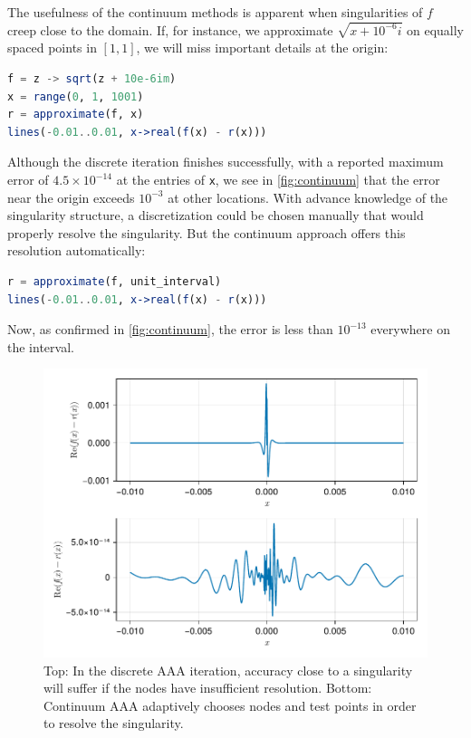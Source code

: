 \documentclass{juliacon}
\begin{document}
The usefulness of the continuum methods is apparent when singularities of $f$ creep close to the domain. If, for instance, we approximate $\sqrt{x + 10^{-6}i}$ on equally spaced points in $[1,1]$, we will miss important details at the origin:
\begin{lstlisting}[language = Julia, caption={Discrete AAA for $\sqrt{x + 10^{-6}i}$.}]
f = z -> sqrt(z + 10e-6im)
x = range(0, 1, 1001)
r = approximate(f, x)
lines(-0.01..0.01, x->real(f(x) - r(x)))
\end{lstlisting}
Although the discrete iteration finishes successfully, with a reported maximum error of $4.5\times 10^{-14}$ at the entries of \verb|x|, we see in \autoref{fig:continuum} that the error near the origin exceeds $10^{-3}$ at other locations. With advance knowledge of the singularity structure, a discretization could be chosen manually that would properly resolve the singularity. But the continuum approach offers this resolution automatically:
\begin{lstlisting}[language = Julia, caption={Continuum AAA for $\sqrt{x + 10^{-6}i}$.}]
r = approximate(f, unit_interval)
lines(-0.01..0.01, x->real(f(x) - r(x)))
\end{lstlisting}
Now, as confirmed in \autoref{fig:continuum}, the error is less than $10^{-13}$ everywhere on the interval. 

\begin{figure}
\centering
\includegraphics[width=\columnwidth]{continuum.pdf}
\caption{Top: In the discrete AAA iteration, accuracy close to a singularity will suffer if the nodes have insufficient resolution. Bottom: Continuum AAA adaptively chooses nodes and test points in order to resolve the singularity.}
\label{fig:continuum}
\end{figure}
\end{document}
